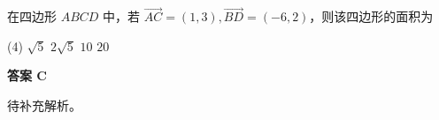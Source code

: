 \begin{choice}[topic={向量叉积与面积}]
在四边形 $ABCD$ 中，若 $\vec{AC} = (1,3), \vec{BD} = (-6,2)$，则该四边形的面积为
\begin{tasks}(4)
	\task $\sqrt{5}$
	\task $2\sqrt{5}$
	\task $10$
	\task $20$
\end{tasks}
\end{choice}
\begin{choice-sol}
\textbf{答案 C}

待补充解析。
\end{choice-sol}
